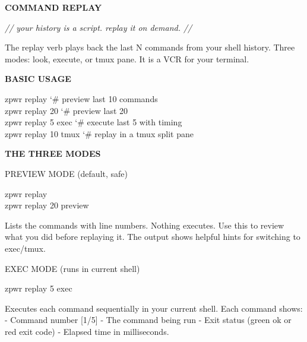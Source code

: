 \documentclass[11pt,a4paper,twoside]{book}
\begin{document}
\vspace{10pt}
{\large\bfseries\color{neoncyan} COMMAND REPLAY}\vspace{6pt}

{\small\itshape\color{dimtext} // your history is a script. replay it on demand. //}

The replay verb plays back the last N commands from your shell history. Three modes: look, execute, or tmux pane. It is a VCR for your terminal.


\vspace{12pt}
{\bfseries\color{neonyellow} BASIC USAGE}\vspace{4pt}

\begin{codebox}
\color{neongreen}zpwr replay                         {\char`\#} preview last 10 commands\\
\color{neongreen}zpwr replay 20                      {\char`\#} preview last 20\\
\color{neongreen}zpwr replay 5 exec                  {\char`\#} execute last 5 with timing\\
\color{neongreen}zpwr replay 10 tmux                 {\char`\#} replay in a tmux split pane\\
\end{codebox}


\vspace{12pt}
{\bfseries\color{neonyellow} THE THREE MODES}\vspace{4pt}

PREVIEW MODE (default, safe)

\begin{codebox}
\color{neongreen}zpwr replay\\
\color{neongreen}zpwr replay 20 preview\\
\end{codebox}

Lists the commands with line numbers. Nothing executes. Use this to review what you did before replaying it. The output shows helpful hints for switching to exec/tmux.

EXEC MODE (runs in current shell)

\begin{codebox}
\color{neongreen}zpwr replay 5 exec\\
\end{codebox}

Executes each command sequentially in your current shell. Each command shows: - Command number [1/5] - The command being run - Exit status (green ok or red exit code) - Elapsed time in milliseconds.
\end{document}
